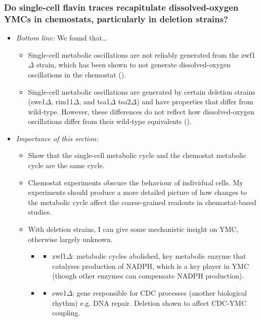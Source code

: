 \subsubsection{Do single-cell flavin traces recapitulate dissolved-oxygen YMCs in chemostats, particularly in deletion strains?}
\label{sec:org3570eea}
\begin{itemize}
\item \emph{Bottom line:} We found that\ldots{}
\begin{itemize}
\item Single-cell metabolic oscillations are not reliably generated from the zwf1\(\Delta\) strain, which has been shown to not generate dissolved-oxygen oscillations in the chemostat (\cite{tuCyclicChangesMetabolic2007}).
\item Single-cell metabolic oscillations are generated by certain deletion strains (swe1\(\Delta\), rim11\(\Delta\), and tsa1\(\Delta\) tsa2\(\Delta\)) and have properties that differ from wild-type.  However, these differences do not reflect how dissolved-oxygen oscillations differ from their wild-type equivalents (\cite{caustonMetabolicCyclesYeast2015}).
\end{itemize}
\item \emph{Importance of this section:}
\begin{itemize}
\item Show that the single-cell metabolic cycle and the chemostat metabolic cycle are the same cycle.
\item Chemostat experiments obscure the behaviour of individual cells.  My experiments should produce a more detailed picture of how changes to the metabolic cycle affect the coarse-grained readouts in chemostat-based studies.
\item With deletion strains, I can give some mechanistic insight on YMC, otherwise largely unknown.
\begin{itemize}
\item \cite{tuCyclicChangesMetabolic2007}
\begin{itemize}
\item zwf1\(\Delta\): metabolic cycles abolished, key metabolic enzyme that catalyses production of NADPH, which is a key player in YMC (though other enzymes can compensate NADPH production).
\end{itemize}
\item \cite{caustonMetabolicCyclesYeast2015}
\begin{itemize}
\item swe1\(\Delta\): gene responsible for CDC processes (another biological rhythm) e.g. DNA repair.  Deletion shown to affect CDC-YMC coupling.

\end{itemize}
\end{itemize}
\end{itemize}
\end{itemize}
